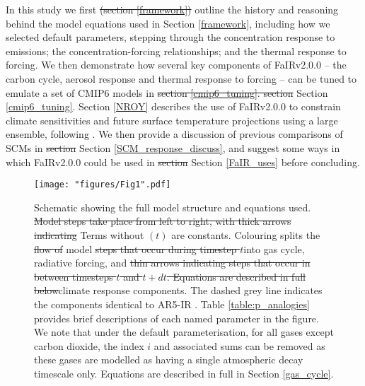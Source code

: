\documentclass[gmd, manuscript]{copernicus}
\providecommand{\DIFadd}[1]{{\protect\color{blue}#1}} %
\providecommand{\DIFdel}[1]{{\protect\color{red}\sout{#1}}}                      %
\providecommand{\DIFaddbegin}{} %
\providecommand{\DIFaddend}{} %
\providecommand{\DIFdelbegin}{} %
\providecommand{\DIFdelend}{} %
\providecommand{\DIFaddFL}[1]{\DIFadd{#1}} %
\providecommand{\DIFdelFL}[1]{\DIFdel{#1}} %
\providecommand{\DIFaddbeginFL}{} %
\providecommand{\DIFaddendFL}{} %
\providecommand{\DIFdelbeginFL}{} %
\providecommand{\DIFdelendFL}{} %
\begin{document}
%
In this study we first \DIFdelbegin \DIFdel{(section \ref{framework}) }\DIFdelend outline the history and reasoning behind the model equations used \DIFaddbegin \DIFadd{in Section \ref{framework}}\DIFaddend , including how we selected default parameters, stepping through the concentration response to emissions; the concentration-forcing relationships; and the thermal response to forcing. We then demonstrate how several key components of FaIRv2.0\DIFaddbegin \DIFadd{.0 }\DIFaddend -- the carbon cycle, aerosol response and thermal response to forcing -- can be tuned to emulate a set of CMIP6 models in \DIFdelbegin \DIFdel{section \ref{cmip6_tuning}. section }\DIFdelend \DIFaddbegin \DIFadd{Section \ref{cmip6_tuning}. Section }\DIFaddend \ref{NROY} describes the use of FaIRv2.0\DIFaddbegin \DIFadd{.0 }\DIFaddend to constrain climate sensitivities and future surface temperature projections using a large ensemble, following \cite{Smith2018}. We then provide a discussion of previous comparisons of SCMs in \DIFdelbegin \DIFdel{section }\DIFdelend \DIFaddbegin \DIFadd{Section }\DIFaddend \ref{SCM_response_discuss}, and suggest some ways in which FaIRv2.0\DIFaddbegin \DIFadd{.0 }\DIFaddend could be used in \DIFdelbegin \DIFdel{section }\DIFdelend \DIFaddbegin \DIFadd{Section }\DIFaddend \ref{FaIR_uses} before concluding.
\DIFaddbegin \clearpage
\DIFaddend %
\begin{figure}[t]
    \DIFdelbeginFL %
\DIFdelendFL \DIFaddbeginFL \texttt{[image: "figures/Fig1".pdf]}
    \DIFaddendFL \caption{Schematic showing the full model structure and equations used. \DIFdelbeginFL \DIFdelFL{Model steps take place from left to right, with thick arrows indicating }\DIFdelendFL \DIFaddbeginFL \DIFaddFL{Terms without $(t)$ are constants. Colouring splits }\DIFaddendFL the \DIFdelbeginFL \DIFdelFL{flow of }\DIFdelendFL model \DIFdelbeginFL \DIFdelFL{steps that occur during timestep $t$}\DIFdelendFL \DIFaddbeginFL \DIFaddFL{into gas cycle, radiative forcing}\DIFaddendFL , and \DIFdelbeginFL \DIFdelFL{thin arrows indicating steps that occur in between timesteps $t$ and $t+dt$. Equations are described in full below}\DIFdelendFL \DIFaddbeginFL \DIFaddFL{climate response components}\DIFaddendFL . The dashed grey line indicates the components identical to AR5-IR \citep{Myhre2013a}. Table \ref{table:p_analogies} provides brief descriptions of each named parameter in the figure. \DIFaddbeginFL \DIFaddFL{We note that under the default parameterisation, for all gases except carbon dioxide, the index $i$ and associated sums can be removed as these gases are modelled as having a single atmospheric decay timescale only. Equations are described in full in Section \ref{gas_cycle}.}\DIFaddendFL }
    \label{fig:schematic}
\end{figure}
\end{document}
